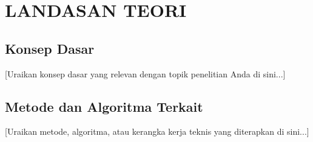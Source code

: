 \section{LANDASAN TEORI}
\label{sec:landasan-teori}

\subsection{Konsep Dasar}
[Uraikan konsep dasar yang relevan dengan topik penelitian Anda di sini...]

\subsection{Metode dan Algoritma Terkait}
[Uraikan metode, algoritma, atau kerangka kerja teknis yang diterapkan di sini...]
